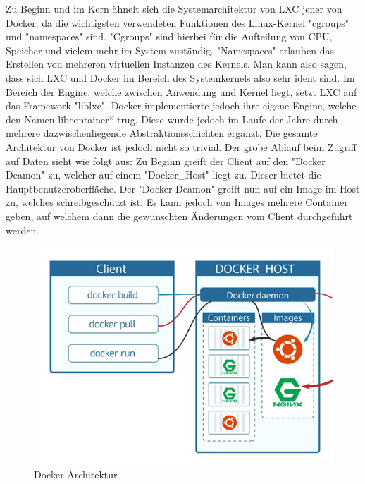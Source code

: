 

Zu Beginn und im Kern ähnelt sich die Systemarchitektur von LXC jener von Docker, da die wichtigsten verwendeten Funktionen des Linux-Kernel "cgroups" und "namespaces" sind. "Cgroups" sind hierbei für die Aufteilung von CPU, Speicher und vielem mehr im System zuständig. "Namespaces" erlauben das Erstellen von mehreren virtuellen Instanzen des Kernels. Man kann also sagen, dass sich LXC und Docker im Bereich des Systemkernels also sehr ident sind.
Im Bereich der Engine, welche zwischen Anwendung und Kernel liegt, setzt LXC auf das Framework "liblxc". Docker implementierte jedoch ihre eigene Engine, welche den Namen libcontainer“ trug. Diese wurde jedoch im Laufe der Jahre durch mehrere dazwischenliegende Abstraktionsschichten ergänzt.
Die gesamte Architektur von Docker ist jedoch nicht so trivial. Der grobe Ablauf beim Zugriff auf Daten sieht wie folgt aus:
Zu Beginn greift der Client auf den "Docker Deamon" zu, welcher auf einem "Docker\_Host" liegt zu. Dieser bietet die Hauptbenutzeroberfläche. Der "Docker Deamon" greift nun auf ein Image im Host zu, welches schreibgeschützt ist. Es kann jedoch von Images mehrere Container geben, auf welchem dann die gewünschten Änderungen vom Client durchgeführt werden.

\begin{figure}[h]
    \centering
    \includegraphics{media/DockerAndContainering/DockerArchitektur.png}
    \caption{Docker Architektur}
\end{figure}


